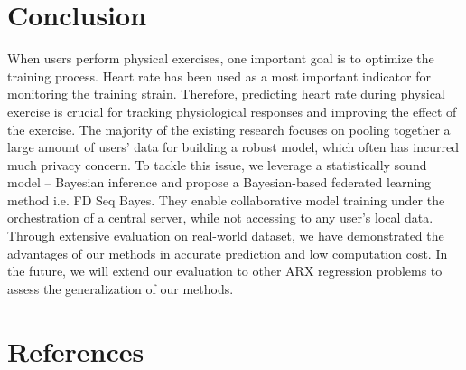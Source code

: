 \documentclass[journal,transmag]{IEEEtran}
\begin{document}
\vspace{2em}
\section{Conclusion}

When users perform physical exercises, one important goal is to optimize the training process. Heart rate has been used as a most important indicator for monitoring the training strain. Therefore, predicting heart rate during physical exercise is crucial for tracking physiological responses and improving the effect of the exercise. The majority of the existing research focuses on pooling together a large amount of users’ data for building a robust model, which often has incurred much privacy concern. To tackle this issue, we leverage a statistically sound model – Bayesian inference and propose a Bayesian-based federated learning method i.e. FD Seq Bayes. They enable collaborative model training under the orchestration of a central server, while not accessing to any user’s local data. Through extensive evaluation on real-world dataset, we have demonstrated the advantages of our methods in accurate prediction and low computation cost. In the future, we will extend our evaluation to other ARX regression problems to assess the generalization of our methods.

\section{References}
\end{document}
